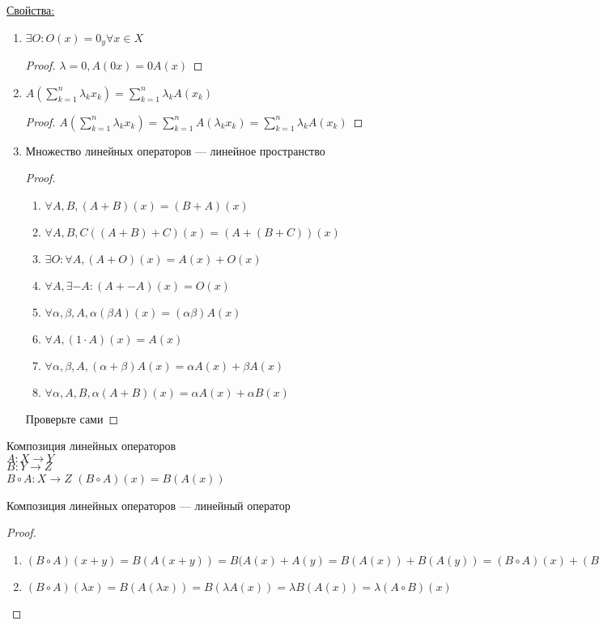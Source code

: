 \underline{Свойства:}
\begin{enumerate}
\item $\exists O \colon O(x) = 0_y \forall x \in X$
\begin{proof}
$\lambda = 0, A(0x) = 0A(x)$
\end{proof}
\item $A(\sum_{k = 1}^n \lambda_k x_k) = \sum_{k = 1}^n \lambda_k A(x_k)$
\begin{proof}
$A(\sum_{k = 1}^n \lambda_k x_k) = \sum_{k = 1}^n A(\lambda_k x_k) = \sum_{k = 1}^n \lambda_k A(x_k)$
\end{proof}
\item Множество линейных операторов --- линейное пространство
\begin{proof}
\begin{enumerate}
\item $\forall A, B, (A + B)(x) = (B + A)(x)$
\item $\forall A, B, C ((A + B) + C)(x) = (A + (B + C))(x)$
\item $\exists O \colon \forall A, (A + O)(x) = A(x) + O(x)$
\item $\forall A, \exists -A \colon (A + -A)(x) = O(x)$
\item $\forall \alpha, \beta, A, \alpha(\beta A)(x) = (\alpha \beta)A(x)$
\item $\forall A, (1 \cdot A)(x) = A(x)$
\item $\forall \alpha, \beta, A, (\alpha + \beta)A(x) = \alpha A(x) + \beta A(x)$
\item $\forall \alpha, A, B, \alpha(A + B)(x) = \alpha A(x) + \alpha B(x)$
\end{enumerate}
Проверьте сами
\end{proof}
\end{enumerate}
\begin{Def}
Композиция линейных операторов\\
$A \colon X \rightarrow Y$ \\
$B \colon Y \rightarrow Z$ \\
$B \circ A \colon X \rightarrow Z$
$(B \circ A)(x) = B(A(x))$
\end{Def}
\begin{theorem}
Композиция линейных операторов --- линейный оператор\\
\end{theorem}
\begin{proof}
\begin{enumerate}
\item $(B \circ A)(x + y)  = B(A(x + y)) = B(A(x) + A(y) = B(A(x)) + B(A(y))  = (B \circ A)(x) + (B \circ A)(y)$
\item $(B \circ A)(\lambda x) = B(A(\lambda x)) = B(\lambda A(x)) = \lambda B(A(x)) = \lambda (A \circ B) (x)$
\end{enumerate}
\end{proof}
